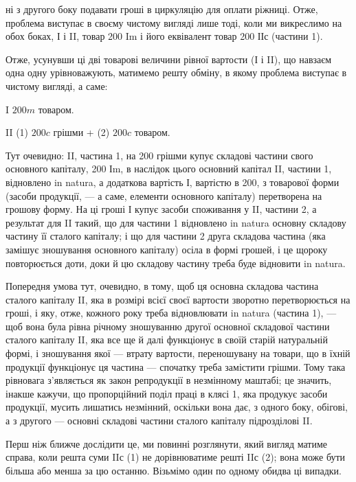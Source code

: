 \parcont{}  %
ні з другого боку подавати гроші в циркуляцію для оплати ріжниці.
Отже, проблема виступає в своєму чистому вигляді лише тоді, коли ми
викреслимо на обох боках, І і II, товар 200 Im і його еквівалент товар
200 ІІс (частини 1).

Отже, усунувши ці дві товарові величини рівної вартости (І і II),
що навзаєм одна одну урівноважують, матимемо решту обміну, в якому
проблема виступає в чистому вигляді, а саме:

I    $200m$ товаром.

II (1) $200c$ грішми + (2) $200c$ товаром.

Тут очевидно: II, частина 1, на 200 грішми купує складові частини
свого основного капіталу, 200 Іm, в наслідок цього основний капітал II,
частини 1, відновлено in natura, а додаткова вартість І, вартістю в 200,
з товарової форми (засоби продукції, — а саме, елементи основного
капіталу) перетворена на грошову форму. На ці гроші І купує засоби
споживання у II, частини 2, а результат для II такий, що для частини 1
відновлено in natura основну складову частину її сталого капіталу; і що
для частини 2 друга складова частина (яка замішує зношування основного
капіталу) осіла в формі грошей, і це щороку повторюється доти,
доки й цю складову частину треба буде відновити in natura.

Попередня умова тут, очевидно, в тому, щоб ця основна складова частина
сталого капіталу II, яка в розмірі всієї своєї вартости зворотно перетворюється
на гроші, і яку, отже, кожного року треба відновлювати in natura
(частина 1), — щоб вона була рівна річному зношуванню другої основної
складової частини сталого капіталу II, яка все ще й далі функціонує в
своїй старій натуральній формі, і зношування якої — втрату вартости,
переношувану на товари, що в їхній продукції функціонує ця частина —
спочатку треба замістити грішми. Тому така рівновага з’являється як
закон репродукції в незмінному маштабі; це значить, інакше кажучи, що
пропорційний поділ праці в клясі 1, яка продукує засоби продукції,
мусить лишатись незмінний, оскільки вона дає, з одного боку, обігові,
а з другого — основні складові частини сталого капіталу підрозділові II.

Перш ніж ближче дослідити це, ми повинні розглянути, який вигляд
матиме справа, коли решта суми IIс (1) не дорівнюватиме решті IIс
(2); вона може бути більша або менша за цю останню. Візьмімо один
по одному обидва ці випадки.

